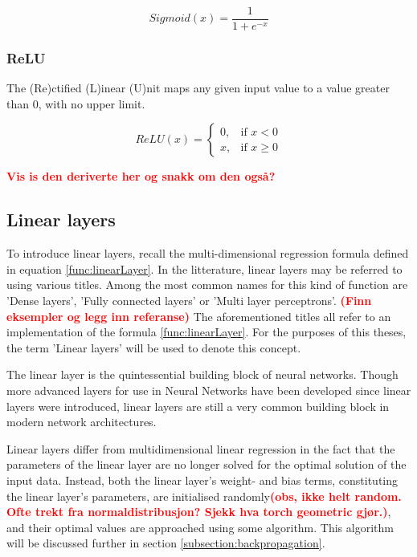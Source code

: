 \[
    Sigmoid(x) =  \frac{1}{1 + e^{-x}}
    \tag{2.6} \label{func:sigmoid}
\]

\subsubsection{ReLU}

The (Re)ctified (L)inear (U)nit maps any given input value to a value greater than 0, with no upper limit.

\[
    ReLU(x) =
    \begin{cases}
        0,& \text{if } x < 0\\
        x,& \text{if } x\ge 0
    \end{cases}
    \tag{2.7} \label{func:relu}
\]

\textcolor{red}{\textbf{Vis is den deriverte her og snakk om den også?}}





\subsection{Linear layers}
\label{subsection:linearLayers}

To introduce linear layers, recall the multi-dimensional regression formula defined in equation \ref{func:linearLayer}.
In the litterature, linear layers may be referred to using various titles. 
Among the most common names for this kind of function are 'Dense layers', 'Fully connected layers' or 'Multi layer perceptrons'.
\textcolor{red}{\textbf{(Finn eksempler og legg inn referanse)}}
The aforementioned titles all refer to an implementation of the formula \ref{func:linearLayer}. 
For the purposes of this theses, the term 'Linear layers' will be used to denote this concept.

The linear layer is the quintessential building block of neural networks. 
Though more advanced layers for use in Neural Networks have been developed since linear layers were introduced, 
linear layers are still a very common building block in modern network architectures. 

Linear layers differ from multidimensional linear regression in the fact that the parameters of the linear layer are no 
longer solved for the optimal solution of the input data.
Instead, both the linear layer's weight- and bias terms, constituting the linear layer's parameters, are initialised randomly\textbf{\textcolor{red}{(obs, ikke helt random. Ofte trekt fra normaldistribusjon? Sjekk hva torch geometric gjør.)}}, 
and their optimal values are approached using some algorithm. This algorithm will be discussed further in section \ref{subsection:backpropagation}.




